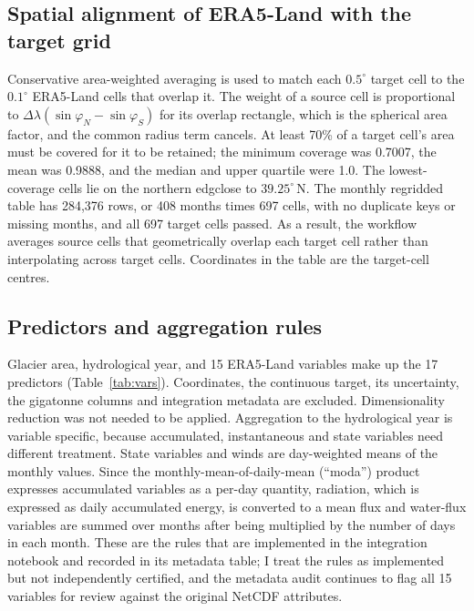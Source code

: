 \documentclass[conference]{IEEEtran}
\begin{document}
\subsection{Spatial alignment of ERA5-Land with the target grid}
Conservative area-weighted averaging is used to match each $0.5^\circ$ target cell to the $0.1^\circ$ ERA5-Land cells that overlap it. The weight of a source cell is proportional to $\Delta\lambda(\sin\varphi_N-\sin\varphi_S)$ for its overlap rectangle, which is the spherical area factor, and the common radius term cancels. At least 70\% of a target cell's area must be covered for it to be retained; the minimum coverage was 0.7007, the mean was 0.9888, and the median and upper quartile were 1.0. The lowest-coverage cells lie on the northern edgclose to $39.25^\circ$\,N. The monthly regridded table has 284,376 rows, or 408 months times 697 cells, with no duplicate keys or missing months, and all 697 target cells passed. As a result, the workflow averages source cells that geometrically overlap each target cell rather than interpolating across target cells. Coordinates in the table are the target-cell centres.

\subsection{Predictors and aggregation rules}
Glacier area, hydrological year, and 15 ERA5-Land variables make up the 17 predictors (Table~\ref{tab:vars}). Coordinates, the continuous target, its uncertainty, the gigatonne columns and integration metadata are excluded. Dimensionality reduction was not needed to be applied. Aggregation to the hydrological year is variable specific, because accumulated, instantaneous and state variables need different treatment. State variables and winds are day-weighted means of the monthly values. Since the monthly-mean-of-daily-mean (``moda'') product expresses accumulated variables as a per-day quantity, radiation, which is expressed as daily accumulated energy, is converted to a mean flux and water-flux variables are summed over months after being multiplied by the number of days in each month. These are the rules that are implemented in the integration notebook and recorded in its metadata table; I treat the rules as implemented but not independently certified, and the metadata audit continues to flag all 15 variables for review against the original NetCDF attributes.
\end{document}
